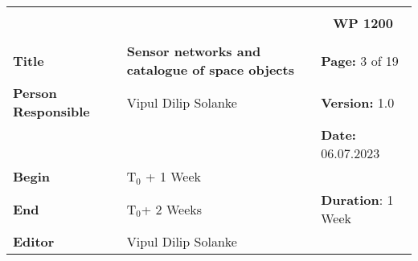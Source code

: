\begin{table}[!h]
  \begin{center}
    \begin{tabular}{|p{35mm}||p{55mm}|p{50mm}||p{40mm}|}
      \hline
      \multicolumn{3}{|l||}{\textbf{}} & \multicolumn{1}{c|}{}                                                                                                                                                \\
      \multicolumn{3}{|l||}{\textbf{}} & \multicolumn{1}{c|}{\textbf{WP 1200}}                                                                                                                                \\
      \multicolumn{3}{|l||}{\textbf{}} & \multicolumn{1}{c|}{}                                                                                                                                                \\
      \hline\hline
      \textbf{Title}                   & \multicolumn{2}{p{7cm}||}{\textbf{Sensor networks and catalogue of space objects}}
                                       & \textbf{Page:} 3 of 19                                                                                                                                             \\
      \hline
      \textbf{Person Responsible}        & \multicolumn{2}{l||}{Vipul Dilip Solanke}                                                                                                   & \textbf{Version:} 1.0   \\
      \hline
      \multicolumn{3}{|l||}{}          & \textbf{Date:} 06.07.2023                                                                                                                                          \\
      \hline\hline
      \textbf{Begin}                  & \multicolumn{2}{l||}{T$_0$ + 1 Week}                                                                                                                &                         \\
      \hline
      \textbf{End}                    & \multicolumn{2}{l||}{T$_0$+ 2 Weeks}                                                                                                        & \textbf{Duration}: 1 Week \\
      \hline\hline
      \textbf{Editor}              & \multicolumn{3}{l|}{Vipul Dilip Solanke}                                                                                                                              \\

\end{tabular}
\end{center}
\end{table}
